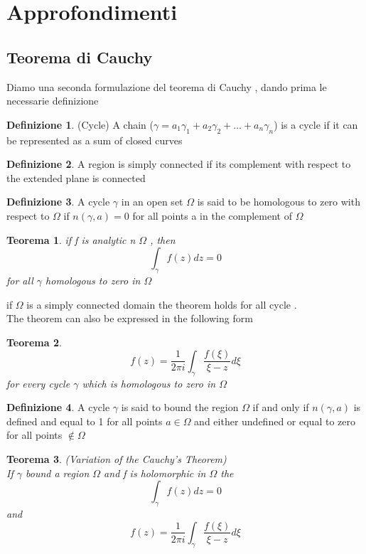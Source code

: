 \documentclass{article}
\newtheorem{teorema}{Teorema}[subsection]
\theoremstyle{definition}
\newtheorem*{definizione}{Definizione}
\begin{document}
\newpage
\section{Approfondimenti}
\subsection{Teorema di Cauchy}
Diamo una seconda formulazione del teorema di Cauchy , dando prima le necessarie definizione
\begin{definizione}(Cycle)
	A chain ($\gamma=a_1\gamma_1+a_2\gamma_2+\dots+a_n\gamma_n$) is a cycle if it can be represented as a sum of  closed curves
\end{definizione}
\begin{definizione}
	A region is simply connected if its complement with  respect to the extended plane is connected 
\end{definizione}
\begin{definizione}
	A cycle $\gamma$ in an open set $\Omega$ is said to be homologous to zero with respect to $\Omega$ if $n(\gamma,a)=0$ for all points a in the complement of $\Omega$
\end{definizione}
\begin{teorema}
	if f is analytic n $\Omega$ , then $$\int_\gamma f(z)dz=0 $$ for all $\gamma$ homologous to zero in $\Omega$
\end{teorema}
if $\Omega$ is a simply connected domain the theorem holds for all cycle  . \\ The theorem can also be expressed in the following form 
\begin{teorema}
	$$f(z)=\frac{1}{2\pi i}\int_{\gamma}\frac{f(\xi)}{\xi-z}d\xi$$
for every cycle $\gamma$ which is homologous to zero in $\Omega$
\end{teorema}
\begin{definizione}
	A cycle $\gamma$ is said to bound the region $\Omega$ if and only if $n(\gamma,a)$ is defined and equal to 1 for all points $a \in \Omega$ and either undefined or equal to zero for all points $\notin \Omega$ 
\end{definizione}
\begin{teorema}(Variation of the Cauchy's Theorem) \\
	If $\gamma$ bound a region $\Omega$ and f is holomorphic in $\Omega$ the 
	$$\int_\gamma f(z)dz=0$$
	and
	$$f(z)=\frac{1}{2\pi i}\int_{\gamma}\frac{f(\xi)}{\xi-z}d\xi$$
	\
\end{teorema}
\end{document}
